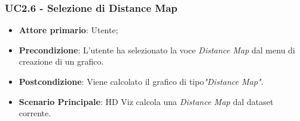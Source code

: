 \subsubsection{UC2.6 - Selezione di Distance Map}
\label{ssub:UC2.6}
\begin{itemize}
	\item \textbf{Attore primario}:		Utente;
	\item \textbf{Precondizione}:		L'utente ha selezionato la voce \emph{Distance Map} dal menu di creazione di un grafico.
	\item \textbf{Postcondizione}:		Viene calcolato il grafico di tipo\emph{"Distance Map"}.
	\item \textbf{Scenario Principale}: HD Viz calcola una  \emph{Distance Map} dal dataset corrente.
\end{itemize}